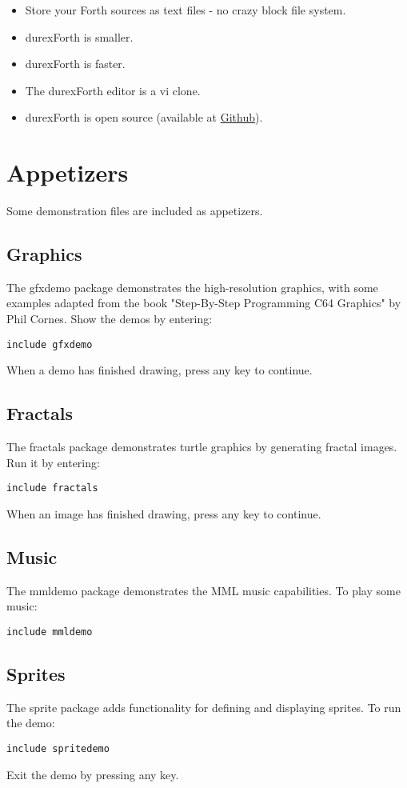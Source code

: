 \begin{itemize}
\item Store your Forth sources as text files - no crazy block file system.
\item durexForth is smaller.
\item durexForth is faster.
\item The durexForth editor is a vi clone.
\item durexForth is open source (available at \href{https://github.com/jkotlinski/durexforth}{Github}).
\end{itemize}

\section{Appetizers}

Some demonstration files are included as appetizers.

\subsection{Graphics}

The gfxdemo package demonstrates the high-resolution graphics, with some examples adapted from the book "Step-By-Step Programming C64 Graphics" by Phil Cornes. 
Show the demos by entering:

\texttt{include gfxdemo}

When a demo has finished drawing, press any key to continue.

\subsection{Fractals}

The fractals package demonstrates turtle graphics by generating fractal images. Run it by entering:

\texttt{include fractals}

When an image has finished drawing, press any key to continue.

\subsection{Music}

The mmldemo package demonstrates the MML music capabilities. To play some music:

\texttt{include mmldemo}

\subsection{Sprites}

The sprite package adds functionality for defining and displaying sprites. To run the demo:

\texttt{include spritedemo}

Exit the demo by pressing any key.
